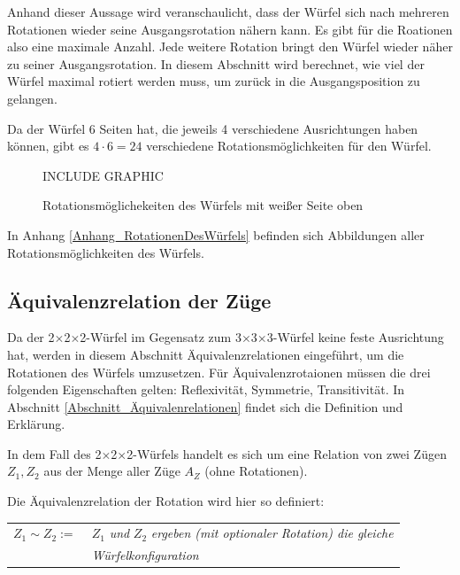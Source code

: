 \documentclass[12pt,a4paper, usenames, dvipsnames]{article}
\theoremstyle{mystyle}
\theoremstyle{definition}
\newcommand{\Ttwo}{2$\times$2$\times$2-}
\newcommand{\Tthree}{3$\times$3$\times$3-}
\begin{document}
Anhand dieser Aussage wird veranschaulicht, dass der Würfel sich nach mehreren Rotationen wieder seine Ausgangsrotation nähern kann. Es gibt für die Roationen also eine maximale Anzahl. Jede weitere Rotation bringt den Würfel wieder näher zu seiner Ausgangsrotation.
In diesem Abschnitt wird berechnet, wie viel der Würfel maximal rotiert werden muss, um zurück in die Ausgangsposition zu gelangen.

Da der Würfel 6 Seiten hat, die jeweils 4 verschiedene Ausrichtungen haben können, gibt es $4 \cdot 6 = 24$ verschiedene Rotationsmöglichkeiten für den Würfel.

\begin{figure}[H]
\centering
INCLUDE GRAPHIC
\caption{Rotationsmöglichekeiten des Würfels mit weißer Seite oben}
\label{AbbildungWürfelRotationWeisseSeite}
\end{figure}


In Anhang \ref{Anhang_RotationenDesWürfels} befinden sich Abbildungen aller Rotationsmöglichkeiten des Würfels.





%
%
%
%
%
%
%
%
%
%
%
%
%
%
%
%
%
%
%
%
\color{black}

\subsection{Äquivalenzrelation der Züge}
\label{Abschnitt_ÄquivalenzrelationDerZüge}

Da der \Ttwo Würfel im Gegensatz zum \Tthree Würfel keine feste Ausrichtung hat, werden in diesem Abschnitt Äquivalenzrelationen eingeführt, um die Rotationen des Würfels umzusetzen.
Für Äquivalenzrotaionen müssen die drei folgenden Eigenschaften gelten: Reflexivität, Symmetrie, Transitivität. In Abschnitt \ref{Abschnitt_Äquivalenrelationen} findet sich die Definition und Erklärung.

In dem Fall des \Ttwo Würfels handelt es sich um eine Relation von zwei Zügen $Z_1, Z_2$ aus der Menge aller Züge $A_Z$ (ohne Rotationen). 

Die Äquivalenzrelation der Rotation wird hier so definiert: 


\begin{tabular}{l l}
$Z_1 \sim Z_2 := \ $  & $Z_1$ \textit{und} $Z_2$ \textit{ergeben (mit optionaler Rotation) die gleiche }\\
\  & \textit{Würfelkonfiguration} \\
\end{tabular} 
\\
\end{document}
